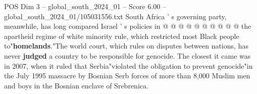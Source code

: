 \begin{textsample}{POS Dim 3 – global\_south\_2024\_01 – Score 6.00 – global\_south\_2024\_01/105031556.txt}
South Africa ' s governing party, meanwhile, has long compared Israel ' s policies in @ @ @ @ @ @ @ @ @ @ the apartheid regime of white minority rule, which restricted most Black people to"\textbf{homelands}."The world court, which rules on disputes between nations, has never \textbf{judged} a country to be responsible for genocide.
The closest it came was in 2007, when it ruled that Serbia"violated the obligation to prevent genocide"in the July 1995 massacre by Bosnian Serb forces of more than 8,000 Muslim men and boys in the Bosnian enclave of Srebrenica.

\end{textsample}
